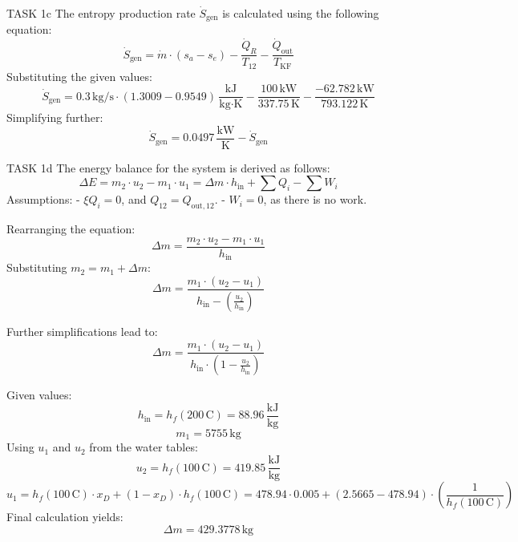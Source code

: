 TASK 1c  
The entropy production rate \( \dot{S}_{\text{gen}} \) is calculated using the following equation:  
\[
\dot{S}_{\text{gen}} = \dot{m} \cdot (s_a - s_e) - \frac{\dot{Q}_{R}}{T_{12}} - \frac{\dot{Q}_{\text{out}}}{T_{\text{KF}}}
\]  
Substituting the given values:  
\[
\dot{S}_{\text{gen}} = 0.3 \, \text{kg/s} \cdot (1.3009 - 0.9549) \, \frac{\text{kJ}}{\text{kg·K}} - \frac{100 \, \text{kW}}{337.75 \, \text{K}} - \frac{-62.782 \, \text{kW}}{793.122 \, \text{K}}
\]  
Simplifying further:  
\[
\dot{S}_{\text{gen}} = 0.0497 \, \frac{\text{kW}}{\text{K}} - \dot{S}_{\text{gen}}
\]  

TASK 1d  
The energy balance for the system is derived as follows:  
\[
\Delta E = m_2 \cdot u_2 - m_1 \cdot u_1 = \Delta m \cdot h_{\text{in}} + \sum Q_i - \sum W_i
\]  
Assumptions:  
- \( \xi Q_i = 0 \), and \( Q_{12} = Q_{\text{out},12} \).  
- \( W_i = 0 \), as there is no work.  

Rearranging the equation:  
\[
\Delta m = \frac{m_2 \cdot u_2 - m_1 \cdot u_1}{h_{\text{in}}}
\]  
Substituting \( m_2 = m_1 + \Delta m \):  
\[
\Delta m = \frac{m_1 \cdot (u_2 - u_1)}{h_{\text{in}} - \left( \frac{u_2}{h_{\text{in}}} \right)}
\]  

Further simplifications lead to:  
\[
\Delta m = \frac{m_1 \cdot (u_2 - u_1)}{h_{\text{in}} \cdot \left( 1 - \frac{u_2}{h_{\text{in}}} \right)}
\]  

Given values:  
\[
h_{\text{in}} = h_{f}(200 \, \text{C}) = 88.96 \, \frac{\text{kJ}}{\text{kg}}
\]  
\[
m_1 = 5755 \, \text{kg}
\]  
Using \( u_1 \) and \( u_2 \) from the water tables:  
\[
u_2 = h_{f}(100 \, \text{C}) = 419.85 \, \frac{\text{kJ}}{\text{kg}}
\]  
\[
u_1 = h_{f}(100 \, \text{C}) \cdot x_D + (1 - x_D) \cdot h_{f}(100 \, \text{C}) = 478.94 \cdot 0.005 + (2.5665 - 478.94) \cdot \left( \frac{1}{h_{f}(100 \, \text{C})} \right)
\]  
Final calculation yields:  
\[
\Delta m = 429.3778 \, \text{kg}
\]